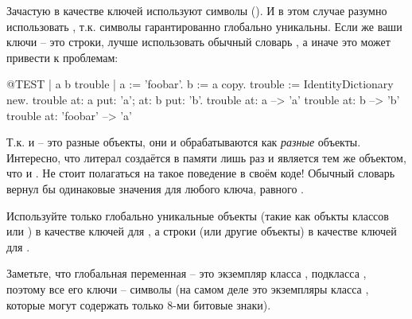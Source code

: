 \documentclass[a4paper,10pt,twoside]{book}
\begin{document}
Зачастую в качестве ключей используют символы (). И в этом случае разумно использовать , т.к. символы гарантированно глобально уникальны.
Если же ваши ключи -- это строки, лучше использовать обычный словарь , а иначе это может привести к проблемам:

\begin{code}{@TEST | a b trouble |}
a := 'foobar'.
b := a copy.
trouble := IdentityDictionary new.
trouble at: a put: 'a'; at: b put: 'b'.
trouble at: a          --> 'a'
trouble at: b          --> 'b'
trouble at: 'foobar' --> 'a'
\end{code}

\noindent
Т.к.  и  -- это разные объекты, они и обрабатываются как \emph{разные} объекты.
Интересно, что литерал \mbox{} создаётся в памяти лишь раз и является тем же объектом, что и .
Не стоит полагаться на такое поведение в своём коде!
Обычный словарь вернул бы одинаковые значения для любого ключа, равного .

Используйте только глобально уникальные объекты (такие как объкты классов  или ) в качестве ключей для , а строки (или другие объекты) в качестве ключей для .


Заметьте, что глобальная переменная  -- это экземпляр класса , подкласса , поэтому все его ключи -- символы (на самом деле это экземпляры класса , которые могут содержать только 8-ми битовые знаки).
\end{document}
